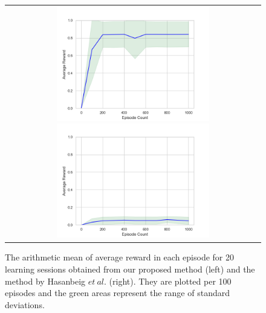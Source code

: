 \documentclass[a4j,12pt,oneside,openany,english]{jsbook}
\begin{document}
\begin{figure}[tbp]
 \centering
 \begin{tabular}{c}
  \begin{minipage}{0.5\hsize}
     \centering
     \includegraphics[bb=0 0 461 346, height = 5cm, width=7cm]{ep_1000_it_10000_MDP3_gamma_095_re2_ini22_nts_c095_20times.png}
 \end{minipage}

 \begin{minipage}{0.5\hsize}
   \centering
   \includegraphics[bb=0 0 461 346, height = 5cm, width=7cm]{ep_1000_it_10000_MDP3_gamma_095_nts_c095_abate_20times.png}
 \end{minipage}
\end{tabular}
 \caption{The arithmetic mean of average reward in each episode for 20 learning sessions obtained from our proposed method (left) and the method by Hasanbeig $et\ al.$\cite{HAK2019} (right). They are plotted per 100 episodes and the green areas represent the range of standard deviations.}
 \label{result}
\end{figure}
\end{document}
